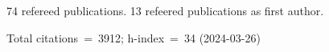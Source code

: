 74 refereed publications. 13 refeered publications as first author.

Total citations~=~3912; h-index~=~34 (2024-03-26)